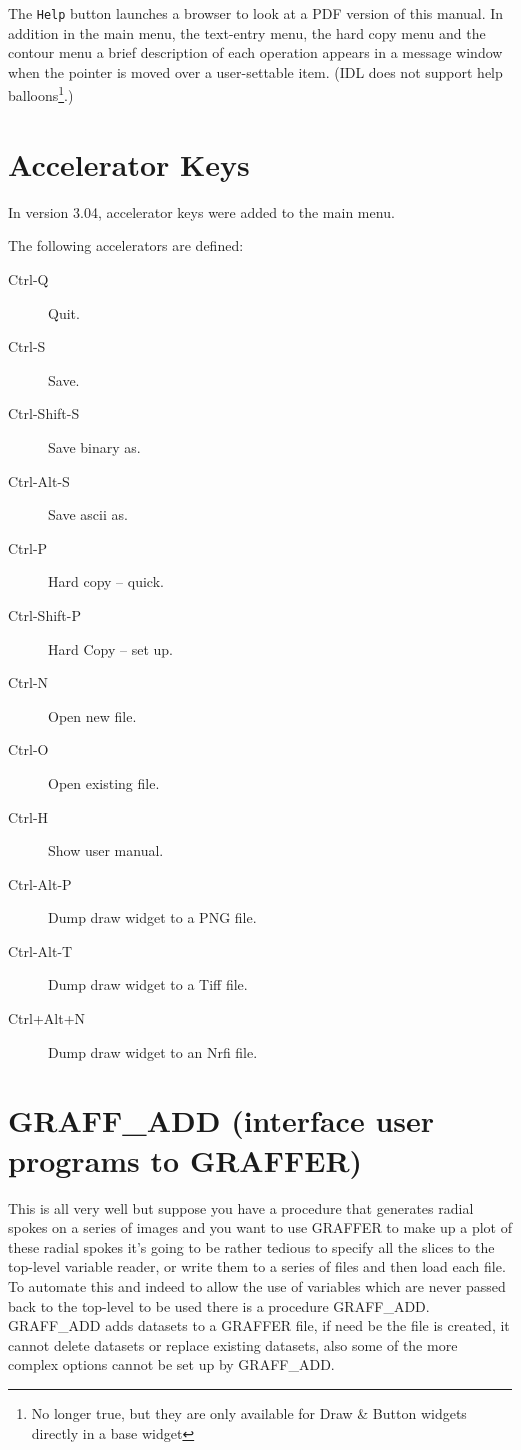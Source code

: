 \documentclass[11pt,twoside,english]{article}
\begin{document}
The \texttt{Help} button launches a browser to look at a PDF version of
this manual. In addition in the main menu, the text-entry menu, the
hard copy menu and the contour menu a brief description of each
operation appears in a message window when the pointer is moved over a
user-settable item. (IDL does not support help balloons\footnote{No
  longer true, but they are only available for Draw \& Button widgets
  directly in a base widget}.)

\section{Accelerator Keys}
\label{sec:accel}

In version 3.04, accelerator keys were added to the main menu.

The following accelerators are defined:
\begin{description}
\item[Ctrl-Q] Quit.
\item[Ctrl-S] Save.
\item[Ctrl-Shift-S] Save binary as.
\item[Ctrl-Alt-S] Save ascii as.
\item[Ctrl-P] Hard copy -- quick.
\item[Ctrl-Shift-P] Hard Copy -- set up.
\item[Ctrl-N] Open new file.
\item[Ctrl-O] Open existing file.
\item[Ctrl-H] Show user manual.
\item[Ctrl-Alt-P] Dump draw widget to a PNG file.
\item[Ctrl-Alt-T] Dump draw widget to a Tiff file.
\item[Ctrl+Alt+N] Dump draw widget to an Nrfi file.
\end{description}

\section{GRAFF\_ADD (interface user programs to GRAFFER)}
\label{sec:graff_add}

This is all very well but suppose you have a procedure that generates
radial spokes on a series of images and you want to use GRAFFER to make
up a plot of these radial spokes it's going to be rather tedious to
specify all the slices to the top-level variable reader, or write them
to a series of files and then load each file. To automate this and
indeed to allow the use of variables which are never passed back to the
top-level to be used there is a procedure GRAFF\_ADD. GRAFF\_ADD adds
datasets to a GRAFFER file, if need be the file is created, it cannot
delete datasets or replace existing datasets, also some of the more
complex options cannot be set up by GRAFF\_ADD.
\end{document}
